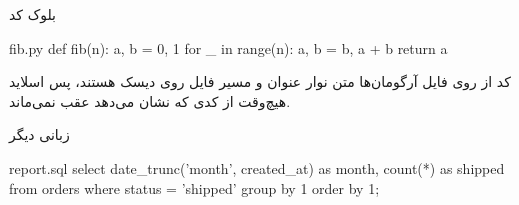 \begin{frame}[fragile]{بلوک کد}
    \begin{codebox}[language=Python]{fib.py}
def fib(n):
    a, b = 0, 1
    for _ in range(n):
        a, b = b, a + b
    return a
    \end{codebox}
\end{frame}

\begin{frame}[fragile]{کد از روی فایل}
    {\small آرگومان‌ها متن نوار عنوان و مسیر فایل روی دیسک هستند، پس اسلاید
    هیچ‌وقت از کدی که نشان می‌دهد عقب نمی‌ماند.}

    \vspace{0.2cm}
\end{frame}

\begin{frame}[fragile]{زبانی دیگر}
    \begin{codebox}[language=SQL]{report.sql}
select date_trunc('month', created_at) as month, count(*) as shipped
from orders
where status = 'shipped'
group by 1
order by 1;
    \end{codebox}
\end{frame}
